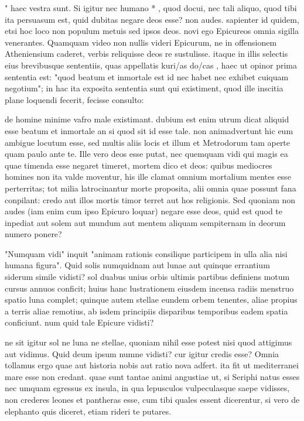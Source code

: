  " haec vestra sunt. Si igitur nec humano * , quod docui, nec tali aliquo, quod tibi ita persuasum est, quid dubitas negare deos esse? non audes. sapienter id quidem, etsi hoc loco non populum metuis sed ipsos deos. novi ego Epicureos omnia sigilla venerantes. Quamquam video non nullis videri Epicurum, ne in offensionem Atheniensium caderet, verbis reliquisse deos re sustulisse. itaque in illis selectis eius brevibusque sententiis, quas appellatis kuri/as do/cas , haec ut opinor prima sententia est: "quod beatum et inmortale est id nec habet nec exhibet cuiquam negotium"; in hac ita exposita sententia sunt qui existiment, quod ille inscitia plane loquendi fecerit, fecisse consulto:

 de homine minime vafro male existimant. dubium est enim utrum dicat aliquid esse beatum et inmortale an si quod sit id esse tale. non animadvertunt hic eum ambigue locutum esse, sed multis aliis locis et illum et Metrodorum tam aperte quam paulo ante te. Ille vero deos esse putat, nec quemquam vidi qui magis ea quae timenda esse negaret timeret, mortem dico et deos: quibus mediocres homines non ita valde moventur, his ille clamat omnium mortalium mentes esse perterritas; tot milia latrocinantur morte proposita, alii omnia quae possunt fana conpilant: credo aut illos mortis timor terret aut hos religionis. Sed quoniam non audes (iam enim cum ipso Epicuro loquar) negare esse deos, quid est quod te inpediat aut solem aut mundum aut mentem aliquam sempiternam in deorum numero ponere?

 "Numquam vidi" inquit "animam rationis consilique participem in ulla alia nisi humana figura". Quid solis numquidnam aut lunae aut quinque errantium siderum simile vidisti? sol duabus unius orbis ultimis partibus definiens motum cursus annuos conficit; huius hanc lustrationem eiusdem incensa radiis menstruo spatio luna complet; quinque autem stellae eundem orbem tenentes, aliae propius a terris aliae remotius, ab isdem principiis disparibus temporibus eadem spatia conficiunt. num quid tale Epicure vidisti?

 ne sit igitur sol ne luna ne stellae, quoniam nihil esse potest nisi quod attigimus aut vidimus. Quid deum ipsum numne vidisti? cur igitur credis esse? Omnia tollamus ergo quae aut historia nobis aut ratio nova adfert. ita fit ut mediterranei mare esse non credant. quae sunt tantae animi angustiae ut, si Seriphi natus esses nec umquam egressus ex insula, in qua lepusculos vulpeculasque saepe vidisses, non crederes leones et pantheras esse, cum tibi quales essent dicerentur, si vero de elephanto quis diceret, etiam rideri te putares.

